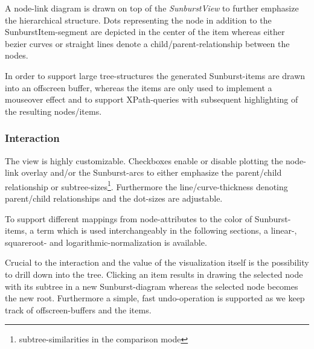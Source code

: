 \begin{itemize}
A node-link diagram is drawn on top of the \emph{SunburstView} to further emphasize the hierarchical structure. Dots representing the node in addition to the SunburstItem-segment are depicted in the center of the item whereas either bezier curves or straight lines denote a child/parent-relationship between the nodes.

In order to support large tree-structures the generated Sunburst-items are drawn into an offscreen buffer, whereas the items are only used to implement a mouseover effect and to support XPath-queries with subsequent highlighting of the resulting nodes/items.

\subsubsection{Interaction}
The view is highly customizable. Checkboxes enable or disable plotting the node-link overlay and/or the Sunburst-arcs to either emphasize the parent/child relationship or subtree-sizes\footnote{subtree-similarities in the comparison mode}. Furthermore the line/curve-thickness denoting parent/child relationships and the dot-sizes are adjustable.




To support different mappings from node-attributes to the color of Sunburst-items, a term which is used interchangeably in the following sections, a linear-, squareroot- and logarithmic-normalization is available.

Crucial to the interaction and the value of the visualization itself is the possibility to drill down into the tree. Clicking an item results in drawing the selected node with its subtree in a new Sunburst-diagram whereas the selected node becomes the new root. Furthermore a simple, fast undo-operation is supported as we keep track of offscreen-buffers and the items. %


\end{itemize}
